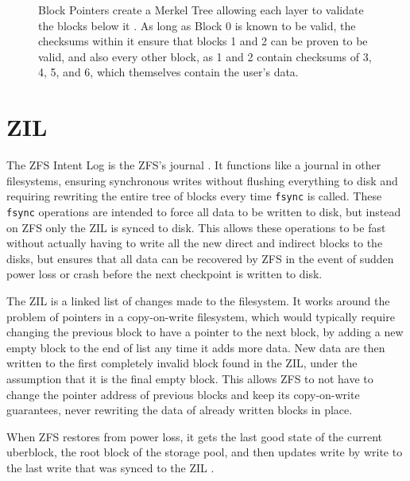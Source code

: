\begin{figure}[H]
    \centering
    \resizebox{0.75\linewidth}{!}{}
    \captionsetup{width=0.75\linewidth}
    \caption{
        Block Pointers create a Merkel Tree allowing each layer to validate the blocks below it
        \cite{azaghal_diagram_2012}. 
        As long as Block 0 is known to be valid, the checksums within it ensure that blocks 1 and 2 can be proven to be valid, 
        and also every other block, as 1 and 2 contain checksums of 3, 4, 5, and 6, which themselves contain the user's data.
    }
\label{fig:HashTree}
\end{figure}

\section{ZIL}
The ZFS Intent Log is the ZFS's journal \cite{ahrens_read_write}.
It functions like a journal in other filesystems, ensuring synchronous writes without flushing everything to disk and 
requiring rewriting the entire tree of blocks every time \texttt{fsync} is called. 
These \texttt{fsync} operations are intended to force all data to be written to disk,
but instead on ZFS only the ZIL is synced to disk.
This allows these operations to be fast without actually having to write all the new direct and indirect blocks to the disks,
but ensures that all data can be recovered by ZFS in the event of sudden power loss or crash before
the next checkpoint is written to disk.

The ZIL is a linked list of changes made to the filesystem.
It works around the problem of pointers in a copy-on-write filesystem, which would typically require
changing the previous block to have a pointer to the next block,
by adding a new empty block to the end of list any time it adds more data.
New data are then written to the first completely invalid block found in the ZIL, 
under the assumption that it is the final empty block.
This allows ZFS to not have to change the pointer address of previous blocks and keep its copy-on-write guarantees, 
never rewriting the data of already written blocks in place.

When ZFS restores from power loss, it gets the last good state of the current uberblock, the root block of the storage pool,
and then updates write by write to the last write that was synced to the ZIL \cite{mckusick_zfs_2015_presentation}.

